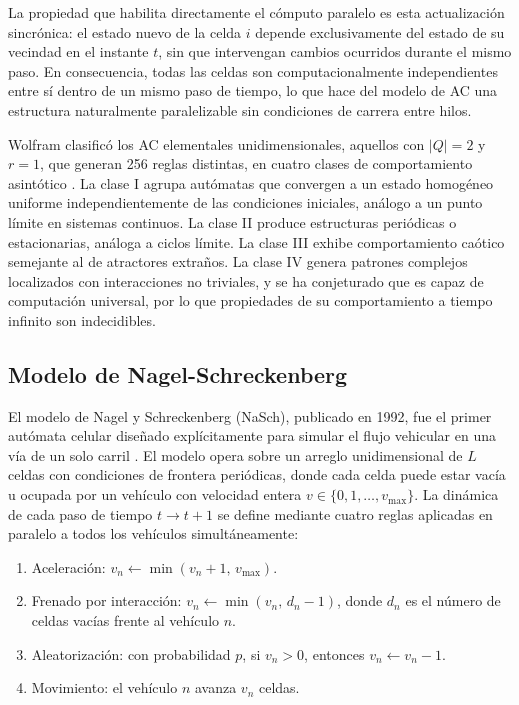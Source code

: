 La propiedad que habilita directamente el cómputo paralelo es esta
actualización sincrónica: el estado nuevo de la celda $i$ depende
exclusivamente del estado de su vecindad en el instante $t$, sin que
intervengan cambios ocurridos durante el mismo paso. En consecuencia,
todas las celdas son computacionalmente independientes entre sí dentro
de un mismo paso de tiempo, lo que hace del modelo de AC una estructura
naturalmente paralelizable sin condiciones de carrera entre hilos.

Wolfram clasificó los AC elementales unidimensionales, aquellos con
$|Q| = 2$ y $r = 1$, que generan 256 reglas distintas, en cuatro clases
de comportamiento asintótico \parencite{Wolfram1984}. La clase I agrupa
autómatas que convergen a un estado homogéneo uniforme independientemente
de las condiciones iniciales, análogo a un punto límite en sistemas
continuos. La clase II produce estructuras periódicas o estacionarias,
análoga a ciclos límite. La clase III exhibe comportamiento caótico
semejante al de atractores extraños. La clase IV genera patrones complejos
localizados con interacciones no triviales, y se ha conjeturado que es
capaz de computación universal, por lo que propiedades de su comportamiento
a tiempo infinito son indecidibles.

\subsection{Modelo de Nagel-Schreckenberg}

El modelo de Nagel y Schreckenberg (NaSch), publicado en 1992, fue el
primer autómata celular diseñado explícitamente para simular el flujo
vehicular en una vía de un solo carril \parencite{NagelSchreckenberg1992}.
El modelo opera sobre un arreglo unidimensional de $L$ celdas con
condiciones de frontera periódicas, donde cada celda puede estar vacía
u ocupada por un vehículo con velocidad entera $v \in \{0, 1,
\ldots, v_{\max}\}$. La dinámica de cada paso de tiempo $t \to t+1$ se
define mediante cuatro reglas aplicadas en paralelo a todos los vehículos
simultáneamente:

\begin{enumerate}
  \item Aceleración: $v_n \leftarrow \min(v_n + 1,\, v_{\max})$.
  \item Frenado por interacción: $v_n \leftarrow \min(v_n,\, d_n - 1)$,
        donde $d_n$ es el número de celdas vacías frente al vehículo $n$.
  \item Aleatorización: con probabilidad $p$, si $v_n > 0$, entonces
        $v_n \leftarrow v_n - 1$.
  \item Movimiento: el vehículo $n$ avanza $v_n$ celdas.
\end{enumerate}


